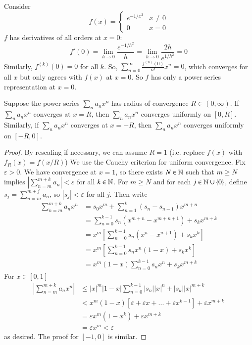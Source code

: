\begin{eg}
    Consider $$f(x) = \left\{\begin{array}{cc} e^{-1/x^2} & x \neq 0 \\ 0 & x =0\end{array}\right.$$ $f$ has derivatives of all orders at $x = 0$: $$f'(0) = \lim\limits_{h\rightarrow 0}\frac{e^{-1/h^2}}{h} = \lim\limits_{h\rightarrow 0}\frac{2h}{e^{1/h^2}} = 0$$ Similarly, $f^{(k)}(0) = 0$ for all $k$. So, $\sum_{n=0}^{\infty}\frac{f^{(n)}(0)}{n!}x^n = 0$, which converges for all $x$ but only agrees with $f(x)$ at $x = 0$. So $f$ has only a power series representation at $x = 0$.
\end{eg}

\begin{thm}[Abel]
    Suppose the power series $\sum_na_nx^n$ has radius of convergence $R \in (0,\infty)$. If $\sum_na_nx^n$ converges at $x = R$, then $\sum_na_nx^n$ converges uniformly on $[0,R]$. Similarly, if $\sum_na_nx^n$ converges at $x = -R$, then $\sum_na_nx^n$ converges uniformly on $[-R,0]$.
\end{thm}
\begin{proof}
    By rescaling if necessary, we can assume $R = 1$ (i.e. replace $f(x)$ with $f_R(x) = f(x/R)$) We use the Cauchy criterion for uniform convergence. Fix $\varepsilon > 0$. We have convergence at $x = 1$, so there exists $N \in \mathbb N$ such that $m \geq N$ implies $\left|\sum_{n=m}^{m+k}a_n\right| < \varepsilon$ for all $k \in \mathbb N$. For $m \geq N$ and for each $j \in \mathbb N\cup\{0\}$, define $s_j = \sum_{n=m}^{m+j}a_n$, so $|s_j| < \varepsilon$ for all $j$. Then write \begin{align*}
        \sum_{n=m}^{m+k}a_nx^n &= s_0x^m + \sum_{n=1}^k(s_n-s_{n-1})x^{m+n} \\
        &= \sum_{n=0}^{k-1}s_n(x^{m+n}-x^{m+n+1}) + s_kx^{m+k} \\
        &= x^m\left[ \sum_{n=0}^{k-1}s_n(x^{n}-x^{n+1}) + s_kx^{k}\right] \\
        &=x^m\left[ \sum_{n=0}^{k-1}s_nx^n(1-x) + s_kx^{k}\right] \\
        &= x^m(1-x)\sum_{n=0}^{k-1}s_nx^n + s_kx^{m+k}
    \end{align*}
    For $x \in [0,1]$ \begin{align*}
        \left|\sum_{n=m}^{m+k}a_nx^n\right| &\leq |x|^m|1-x|\sum_{n=0}^{k-1}|s_n||x|^n + |s_k||x|^{m+k} \\
        &< x^m(1-x)[\varepsilon+\varepsilon x+...+\varepsilon x^{k-1}] + \varepsilon x^{m+k} \\
        &= \varepsilon x^m(1-x^k) + \varepsilon x^{m+k} \\
        &= \varepsilon x^m < \varepsilon
    \end{align*}
    as desired. The proof for $[-1,0]$ is similar.
\end{proof}


